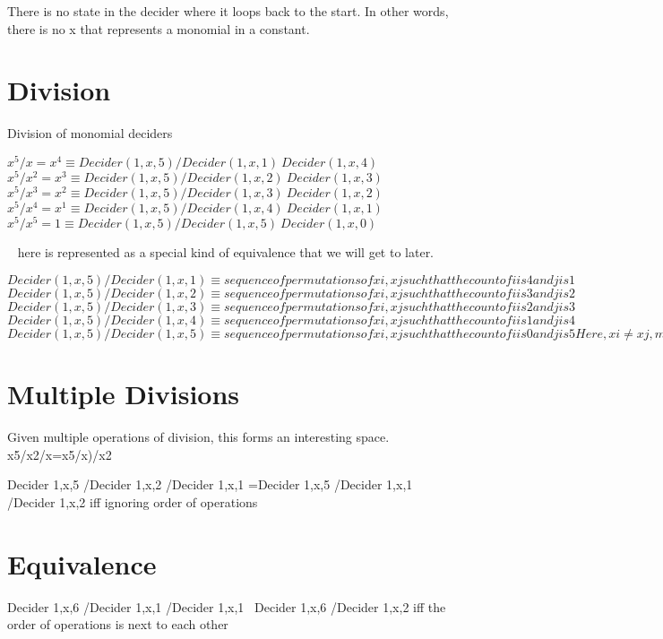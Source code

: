 There is no state in the decider where it loops back to the start. In other words, there is no x that represents a monomial in a constant.

\section{Division}

Division of monomial deciders


$x^5 / x = x^4 \equiv Decider(1,x,5)/Decider(1,x,1) ~ Decider(1,x,4)$
$x^5 / x^2 = x^3 \equiv Decider(1,x,5)/Decider(1,x,2) ~ Decider(1,x,3)$
$x^5 / x^3 = x^2 \equiv Decider(1,x,5)/Decider(1,x,3) ~ Decider(1,x,2)$
$x^5 / x^4 = x^1 \equiv Decider(1,x,5)/Decider(1,x,4) ~ Decider(1,x,1)$
$x^5 / x^5 = 1 \equiv Decider(1,x,5)/Decider(1,x,5) ~ Decider(1,x,0)$

~ here is represented as a special kind of equivalence that we will get to later.

$Decider(1,x,5)/Decider(1,x,1) \equiv
 {sequence of permutations of {xi,xj} such that the count of i is 4 and j is 1}$
$Decider(1,x,5)/Decider(1,x,2) \equiv
 {sequence of permutations of {xi,xj} such that the count of i is 3 and j is 2}$
$Decider(1,x,5)/Decider(1,x,3) \equiv
 {sequence of permutations of {xi,xj} such that the count of i is 2 and j is 3}$
$Decider(1,x,5)/Decider(1,x,4) \equiv
 {sequence of permutations of {xi,xj} such that the count of i is 1 and j is 4}$
$Decider(1,x,5)/Decider(1,x,5) \equiv
 {sequence of permutations of {xi,xj} such that the count of i is 0 and j is 5} Here, xi \neq
 xj, meaning xi is of a different representation than xj$

\section{Multiple Divisions}

Given multiple operations of division, this forms an interesting space.
x5/x2/x=x5/x)/x2

Decider 1,x,5 /Decider 1,x,2 /Decider 1,x,1 =Decider 1,x,5 /Decider 1,x,1 /Decider 1,x,2
 iff ignoring order of operations
 
\section{Equivalence}

Decider 1,x,6 /Decider 1,x,1 /Decider 1,x,1 ~Decider 1,x,6 /Decider 1,x,2
  iff the order of operations is next to each other

